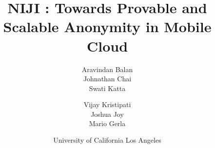 \documentclass{acm_proc_article-sp}
\begin{document}
\title{NIJI : Towards Provable and Scalable Anonymity in Mobile Cloud}



%
%
%
%
%

%
\author {
%
%
\alignauthor
Aravindan Balan\\
\alignauthor
Johnathan Chai\\
\alignauthor
Swati Katta\\
       \and    
\alignauthor
Vijay Kristipati\\
\alignauthor 
Joshua Joy\\
\alignauthor 
Mario Gerla\\
       \and
\alignauthor 
University of California Los Angeles\\
}
\end{document}
